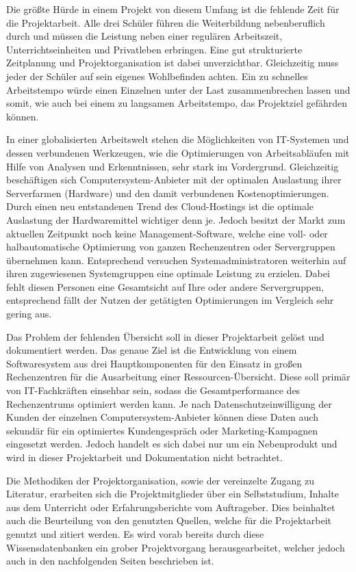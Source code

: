 Die größte Hürde in einem Projekt von diesem Umfang ist die fehlende Zeit für
die Projektarbeit. Alle drei Schüler führen die Weiterbildung nebenberuflich
durch und müssen die Leistung neben einer regulären Arbeitszeit,
Unterrichtseinheiten und Privatleben erbringen. Eine gut strukturierte
Zeitplanung und Projektorganisation ist dabei unverzichtbar. Gleichzeitig muss
jeder der Schüler auf sein eigenes Wohlbefinden achten. Ein zu schnelles
Arbeitstempo würde einen Einzelnen unter der Last zusammenbrechen lassen und
somit, wie auch bei einem zu langsamen Arbeitstempo, das Projektziel gefährden
können.

In einer globalisierten Arbeitswelt stehen die Möglichkeiten von
IT\hyp{}Systemen und dessen verbundenen Werkzeugen, wie die Optimierungen von
Arbeitsabläufen mit Hilfe von Analysen und Erkenntnissen, sehr stark im
Vordergrund.  Gleichzeitig beschäftigen sich Computersystem\hyp{}Anbieter mit
der optimalen Auslastung ihrer Serverfarmen (Hardware) und den damit
verbundenen Kostenoptimierungen. Durch einen neu entstandenen Trend des
Cloud\hyp{}Hostings ist die optimale Auslastung der Hardwaremittel wichtiger
denn je. Jedoch besitzt der Markt zum aktuellen Zeitpunkt noch keine
Management\hyp{}Software, welche eine voll- oder halbautomatische Optimierung
von ganzen Rechenzentren oder Servergruppen übernehmen kann. Entsprechend
versuchen Systemadministratoren weiterhin auf ihren zugewiesenen Systemgruppen
eine optimale Leistung zu erzielen. Dabei fehlt diesen Personen eine
Gesamtsicht auf Ihre oder andere Servergruppen, entsprechend fällt der Nutzen
der getätigten Optimierungen im Vergleich sehr gering aus.

Das Problem der fehlenden Übersicht soll in dieser Projektarbeit gelöst und
dokumentiert werden. Das genaue Ziel ist die Entwicklung von einem
Softwaresystem aus drei Hauptkomponenten für den Einsatz in großen
Rechenzentren für die Ausarbeitung einer Ressourcen\hyp{}Übersicht. Diese soll
primär von IT\hyp{}Fachkräften einsehbar sein, sodass die Gesamtperformance des
Rechenzentrums optimiert werden kann. Je nach Datenschutzeinwilligung der
Kunden der einzelnen Computersystem\hyp{}Anbieter können diese Daten auch
sekundär für ein optimiertes Kundengespräch oder Marketing\hyp{}Kampagnen
eingesetzt werden. Jedoch handelt es sich dabei nur um ein Nebenprodukt und
wird in dieser Projektarbeit und Dokumentation nicht betrachtet.

Die Methodiken der Projektorganisation, sowie der vereinzelte Zugang zu
Literatur, erarbeiten sich die Projektmitglieder über ein Selbststudium,
Inhalte aus dem Unterricht oder Erfahrungsberichte vom Auftrageber. Dies
beinhaltet auch die Beurteilung von den genutzten Quellen, welche für die
Projektarbeit genutzt und zitiert werden. Es wird vorab bereits durch diese
Wissensdatenbanken ein grober Projektvorgang herausgearbeitet, welcher jedoch
auch in den nachfolgenden Seiten beschrieben ist.
\all%

